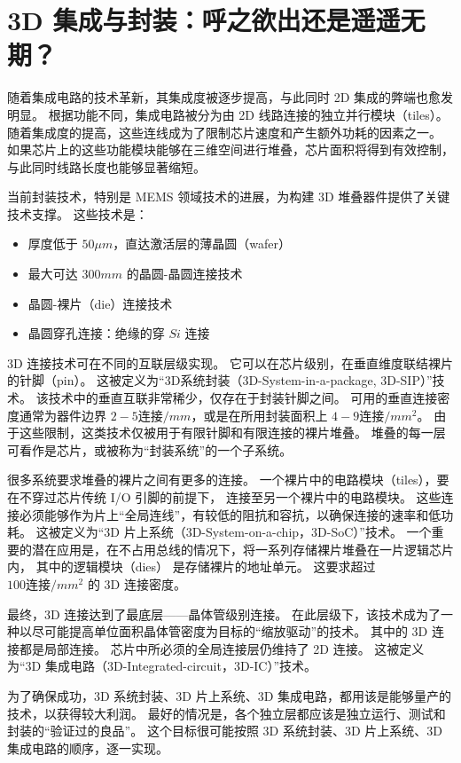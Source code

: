 
\chapter{3D 集成与封装：呼之欲出还是遥遥无期？}

随着集成电路的技术革新，其集成度被逐步提高，与此同时 2D 集成的弊端也愈发明显。
根据功能不同，集成电路被分为由 2D 线路连接的独立并行模块（tiles）。
随着集成度的提高，这些连线成为了限制芯片速度和产生额外功耗的因素之一。
如果芯片上的这些功能模块能够在三维空间进行堆叠，芯片面积将得到有效控制，
与此同时线路长度也能够显著缩短。

当前封装技术，特别是 MEMS 领域技术的进展，为构建 3D 堆叠器件提供了关键技术支撑。
这些技术是：
\begin{itemize}
    \item 厚度低于 $50 \mu m$，直达激活层的薄晶圆（wafer）
    \item 最大可达 $300 mm$ 的晶圆-晶圆连接技术
    \item 晶圆-裸片（die）连接技术
    \item 晶圆穿孔连接：绝缘的穿 $Si$ 连接
\end{itemize}

3D 连接技术可在不同的互联层级实现。
它可以在芯片级别，在垂直维度联结裸片的针脚（pin）。
这被定义为“3D系统封装（3D-System-in-a-package, 3D-SIP）”技术。
该技术中的垂直互联非常稀少，仅存在于封装针脚之间。
可用的垂直连接密度通常为器件边界 $2-5\textrm{连接}/mm$，或是在所用封装面积上
 $4-9\textrm{连接}/mm^2$。
由于这些限制，这类技术仅被用于有限针脚和有限连接的裸片堆叠。
堆叠的每一层可看作是芯片，或被称为“封装系统”的一个子系统。

很多系统要求堆叠的裸片之间有更多的连接。
一个裸片中的电路模块（tiles），要在不穿过芯片传统 I/O 引脚的前提下，
连接至另一个裸片中的电路模块。
这些连接必须能够作为片上“全局连线”，有较低的阻抗和容抗，以确保连接的速率和低功耗。
这被定义为“3D 片上系统（3D-System-on-a-chip，3D-SoC）”技术。
一个重要的潜在应用是，在不占用总线的情况下，将一系列存储裸片堆叠在一片逻辑芯片内，
其中的逻辑模块（dies） 是存储裸片的地址单元。
这要求超过 $100\textrm{连接}/mm^2$ 的 3D 连接密度。

最终，3D 连接达到了最底层——晶体管级别连接。
在此层级下，该技术成为了一种以尽可能提高单位面积晶体管密度为目标的“缩放驱动”的技术。
其中的 3D 连接都是局部连接。
芯片中所必须的全局连接层仍维持了 2D 连接。
这被定义为“3D 集成电路（3D-Integrated-circuit，3D-IC）”技术。

为了确保成功，3D 系统封装、3D 片上系统、3D 集成电路，都用该是能够量产的技术，以获得较大利润。
最好的情况是，各个独立层都应该是独立运行、测试和封装的“验证过的良品”。
这个目标很可能按照 3D 系统封装、3D 片上系统、3D 集成电路的顺序，逐一实现。

